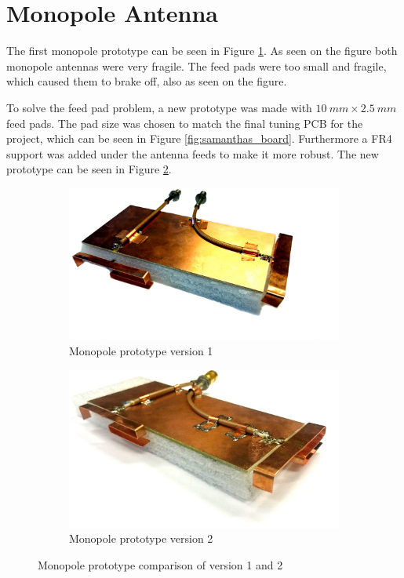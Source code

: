 \section{Monopole Antenna}
The first monopole prototype can be seen in Figure \ref{fig:ant1_proto1_3d}. As seen on the figure both monopole antennas were very fragile. The feed pads were too small and fragile, which caused them to brake off, also as seen on the figure.

To solve the feed pad problem, a new prototype was made with $\SI{10}{mm}\times \SI{2.5}{mm}$ feed pads. The pad size was chosen to match the final tuning PCB for the project, which can be seen in Figure \ref{fig:samanthas_board}. Furthermore a FR4 support was added under the antenna feeds to make it more robust. The new prototype can be seen in Figure \ref{fig:ant1_proto2_3d}.

\begin{figure}[htbp]
  \begin{subfigure}[b]{0.49\linewidth}
        \centering
        \includegraphics[scale=0.2]{img/tech_sol/monopole/prototype_v1/monopole_v1}
        \caption{Monopole prototype version 1}
        \label{fig:ant1_proto1_3d}
    \end{subfigure}
    \hfill
    \begin{subfigure}[b]{0.49\linewidth}
        \centering
        \includegraphics[scale=0.27]{img/tech_sol/monopole/prototype_v2/monopole_v2}
        \caption{Monopole prototype version 2}
        \label{fig:ant1_proto2_3d}
    \end{subfigure}
    \caption{Monopole prototype comparison of version 1 and 2}
    \label{fig:ant_1_proto_3d}
\end{figure}

